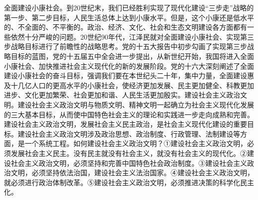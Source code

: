 \documentclass[12pt,UTF8]{ctexart}
\begin{document}
全面建设小康社会。到20世纪末，我们已经胜利实现了现代化建设“三步走”战略的第一步、第二步目标，人民生活总体上达到小康水平。但是，这个小康还是低水平的、不全面的、不平衡的。政治、经济、文化、社会和生态文明建设各方面都有一些依然十分严峻的问题。20世纪90年代，江泽民就对全面建设小康社会、实现第三步战略目标进行了前瞻性的战略思考。党的十五大报告中初步勾画了实现第三步战略目标的蓝图，党的十五届五中全会进一步提出，从新世纪开始，我国将进入全面小康社会、加快推进社会主义现代化的新的发展阶段。党的十六大深刻阐述了全面建设小康社会的奋斗目标，强调我们要在本世纪头二十年，集中力量，全面建设惠及十几亿人口的更高水平的小康社会，使经济更加发展、民主更加健全、科教更加进步、文化更加繁荣、社会更加和谐、人民生活更加殷实。建设社会主义政治文明。建设社会主义政治文明与物质文明、精神文明一起确立为社会主义现代化发展的三大基本目标，从而使中国特色社会主义的理论和实践进一步走向成熟和完善。建设社会主义政治文明，发展社会主义民主政治，是社会主义现代化建设的重要目标。建设社会主义政治文明涉及政治思想、政治制度、行政管理、法制建设等方面，是一个系统工程。如何建设社会主义政治文明？①建设社会主义政治文明，必须发展社会主义民主。没有民主就没有社会主义，就没有社会主义的现代化。②建设社会主义政治文明，必须坚持和完善中国特色社会政治制度。③建设社会主义政治文明，必须坚持依法治国，建设社会主义法治国家。④建设社会主义政治文明，就必须进行政治体制改革。⑤建设社会主义政治文明，必须推进决策的科学化民主化。
\end{document}
